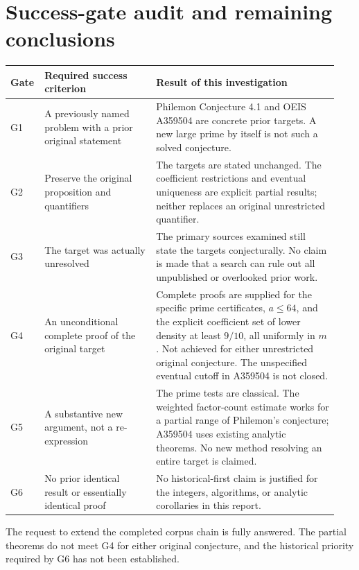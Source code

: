 \documentclass[11pt,a4paper]{article}
\theoremstyle{definition}\newtheorem{definition}[theorem]{Definition}
\theoremstyle{remark}\newtheorem{remark}[theorem]{Remark}
\begin{document}
\section{Success-gate audit and remaining conclusions}\label{sec:gates}
\begingroup\small\setlength{\tabcolsep}{4pt}
\begin{longtable}{@{}>{\raggedright\arraybackslash}p{0.07\linewidth}>{\raggedright\arraybackslash}p{0.33\linewidth}>{\raggedright\arraybackslash}p{0.54\linewidth}@{}}
\toprule
Gate & Required success criterion & Result of this investigation\\
\midrule\endhead
G1 & A previously named problem with a prior original statement &
Philemon Conjecture 4.1 and OEIS A359504 are concrete prior targets. A new
large prime by itself is not such a solved conjecture.\\
G2 & Preserve the original proposition and quantifiers &
The targets are stated unchanged. The coefficient restrictions and
eventual uniqueness are explicit partial results; neither replaces an
original unrestricted quantifier.\\
G3 & The target was actually unresolved &
The primary sources examined still state the targets conjecturally. No
claim is made that a search can rule out all unpublished or overlooked
prior work.\\
G4 & An unconditional complete proof of the original target &
Complete proofs are supplied for the specific prime certificates, $a\leq64$, and the explicit
coefficient set of lower density at least $9/10$, all uniformly in $m$.
Not achieved for either unrestricted original
conjecture. The unspecified eventual cutoff in A359504 is not closed.\\
G5 & A substantive new argument, not a re-expression &
The prime tests are classical. The weighted factor-count estimate works
for a partial range of Philemon's conjecture; A359504 uses existing
analytic theorems. No new method resolving an entire target is claimed.\\
G6 & No prior identical result or essentially identical proof &
No historical-first claim is justified for the integers, algorithms, or
analytic corollaries in this report.\\
\bottomrule
\end{longtable}
\endgroup

The request to extend the completed corpus chain is fully answered.
The partial theorems do not
meet G4 for either original conjecture, and the historical priority required
by G6 has not been established.
\end{document}
